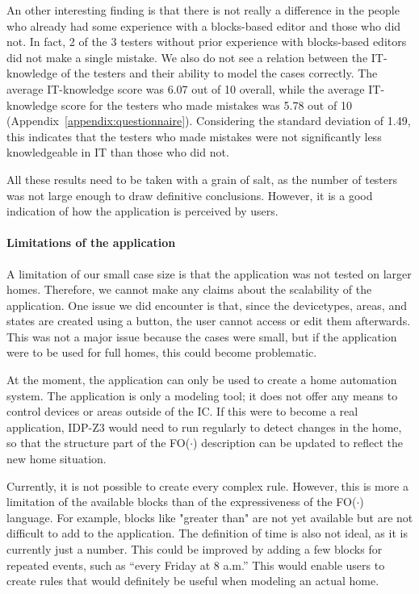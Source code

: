 \documentclass[11pt,a4paper]{report}
\newcommand{\fodot}{FO($\cdot$)\xspace}
\begin{document}
An other interesting finding is that there is not really a difference in the people who already had some experience with a blocks-based editor and those who did not. In fact, 2 of the 3 testers without prior experience with blocks-based editors did not make a single mistake. We also do not see a relation between the IT-knowledge of the testers and their ability to model the cases correctly. The average IT-knowledge score was 6.07 out of 10 overall, while the average IT-knowledge score for the testers who made mistakes was 5.78 out of 10 (Appendix~\ref{appendix:questionnaire}). Considering the standard deviation of 1.49, this indicates that the testers who made mistakes were not significantly less knowledgeable in IT than those who did not.

All these results need to be taken with a grain of salt, as the number of testers was not large enough to draw definitive conclusions. However, it is a good indication of how the application is perceived by users.

\paragraph{Limitations of the application}
A limitation of our small case size is that the application was not tested on larger homes. Therefore, we cannot make any claims about the scalability of the application. One issue we did encounter is that, since the devicetypes, areas, and states are created using a button, the user cannot access or edit them afterwards. This was not a major issue because the cases were small, but if the application were to be used for full homes, this could become problematic.

At the moment, the application can only be used to create a home automation system. The application is only a modeling tool; it does not offer any means to control devices or areas outside of the IC. If this were to become a real application, IDP-Z3 would need to run regularly to detect changes in the home, so that the structure part of the \fodot description can be updated to reflect the new home situation.

Currently, it is not possible to create every complex rule. However, this is more a limitation of the available blocks than of the expressiveness of the \fodot language. For example, blocks like "greater than" are not yet available but are not difficult to add to the application. The definition of time is also not ideal, as it is currently just a number. This could be improved by adding a few blocks for repeated events, such as “every Friday at 8 a.m.” This would enable users to create rules that would definitely be useful when modeling an actual home.
\end{document}
